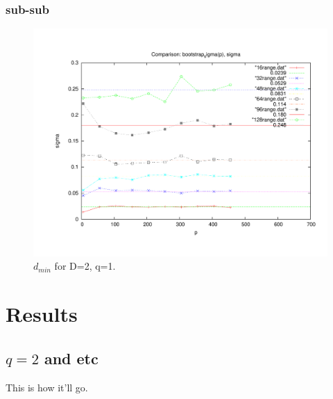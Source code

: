 \documentclass[aps, twocolumn, groupedaddress]{revtex4}
\begin{document}
\subsubsection{sub-sub}
\label{sec-2.2.1}

\begin{figure}[htp]
\centering
\includegraphics[width=.85\textwidth]{boot}
\caption{$d_{min}$ for D=2, q=1.}\label{fig:1}
\end{figure}
\section{Results}
\label{sec-3}
\subsection{$q=2$ and etc}
\label{sec-3.1}

This is how it'll go.



\end{document}

